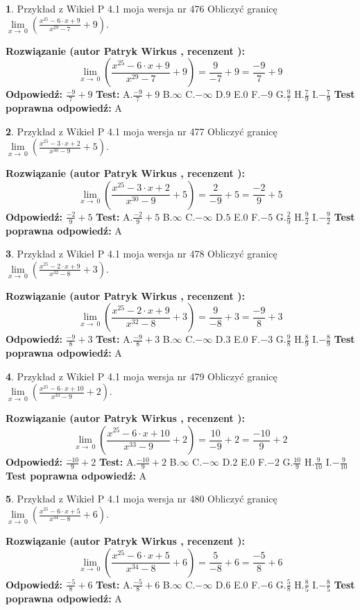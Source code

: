 \documentclass[12pt, a4paper]{article}
\theoremstyle{definition} %
\newtheorem{zad}{}
\newcommand{\zadStart}[1]{\begin{zad}#1\newline}
\newcommand{\zadStop}{\end{zad}}
\newcommand{\rozwStart}[2]{\noindent \textbf{Rozwiązanie (autor #1 , recenzent #2): }\newline}
\newcommand{\rozwStop}{\newline}
\newcommand{\odpStart}{\noindent \textbf{Odpowiedź:}\newline}
\newcommand{\odpStop}{\newline}
\newcommand{\testStart}{\noindent \textbf{Test:}\newline}
\newcommand{\testStop}{\newline}
\newcommand{\kluczStart}{\noindent \textbf{Test poprawna odpowiedź:}\newline}
\newcommand{\kluczStop}{\newline}
\begin{document}
\zadStart{Przykład z Wikieł P 4.1 moja wersja nr 476}
Obliczyć granicę $\lim\limits_{x\to\ 0}(\frac{x^{25}-6 \cdot x +9}{x^{29}-7}+9)$.
\zadStop
\rozwStart{Patryk Wirkus}{}
$$\lim\limits_{x\to\ 0}(\frac{x^{25}-6 \cdot x +9}{x^{29}-7}+9)=\frac{9}{-7}+9=\frac{-9}{7}+9$$
\rozwStop
\odpStart
$\frac{-9}{7}+9$
\odpStop
\testStart
A.$\frac{-9}{7}+9$
B.$\infty$
C.$-\infty$
D.$9$
E.$0$
F.$-9$
G.$\frac{9}{7}$
H.$\frac{7}{9}$
I.$-\frac{7}{9}$
\testStop
\kluczStart
A
\kluczStop



\zadStart{Przykład z Wikieł P 4.1 moja wersja nr 477}
Obliczyć granicę $\lim\limits_{x\to\ 0}(\frac{x^{25}-3 \cdot x +2}{x^{30}-9}+5)$.
\zadStop
\rozwStart{Patryk Wirkus}{}
$$\lim\limits_{x\to\ 0}(\frac{x^{25}-3 \cdot x +2}{x^{30}-9}+5)=\frac{2}{-9}+5=\frac{-2}{9}+5$$
\rozwStop
\odpStart
$\frac{-2}{9}+5$
\odpStop
\testStart
A.$\frac{-2}{9}+5$
B.$\infty$
C.$-\infty$
D.$5$
E.$0$
F.$-5$
G.$\frac{2}{9}$
H.$\frac{9}{2}$
I.$-\frac{9}{2}$
\testStop
\kluczStart
A
\kluczStop



\zadStart{Przykład z Wikieł P 4.1 moja wersja nr 478}
Obliczyć granicę $\lim\limits_{x\to\ 0}(\frac{x^{25}-2 \cdot x +9}{x^{32}-8}+3)$.
\zadStop
\rozwStart{Patryk Wirkus}{}
$$\lim\limits_{x\to\ 0}(\frac{x^{25}-2 \cdot x +9}{x^{32}-8}+3)=\frac{9}{-8}+3=\frac{-9}{8}+3$$
\rozwStop
\odpStart
$\frac{-9}{8}+3$
\odpStop
\testStart
A.$\frac{-9}{8}+3$
B.$\infty$
C.$-\infty$
D.$3$
E.$0$
F.$-3$
G.$\frac{9}{8}$
H.$\frac{8}{9}$
I.$-\frac{8}{9}$
\testStop
\kluczStart
A
\kluczStop



\zadStart{Przykład z Wikieł P 4.1 moja wersja nr 479}
Obliczyć granicę $\lim\limits_{x\to\ 0}(\frac{x^{25}-6 \cdot x +10}{x^{33}-9}+2)$.
\zadStop
\rozwStart{Patryk Wirkus}{}
$$\lim\limits_{x\to\ 0}(\frac{x^{25}-6 \cdot x +10}{x^{33}-9}+2)=\frac{10}{-9}+2=\frac{-10}{9}+2$$
\rozwStop
\odpStart
$\frac{-10}{9}+2$
\odpStop
\testStart
A.$\frac{-10}{9}+2$
B.$\infty$
C.$-\infty$
D.$2$
E.$0$
F.$-2$
G.$\frac{10}{9}$
H.$\frac{9}{10}$
I.$-\frac{9}{10}$
\testStop
\kluczStart
A
\kluczStop



\zadStart{Przykład z Wikieł P 4.1 moja wersja nr 480}
Obliczyć granicę $\lim\limits_{x\to\ 0}(\frac{x^{25}-6 \cdot x +5}{x^{34}-8}+6)$.
\zadStop
\rozwStart{Patryk Wirkus}{}
$$\lim\limits_{x\to\ 0}(\frac{x^{25}-6 \cdot x +5}{x^{34}-8}+6)=\frac{5}{-8}+6=\frac{-5}{8}+6$$
\rozwStop
\odpStart
$\frac{-5}{8}+6$
\odpStop
\testStart
A.$\frac{-5}{8}+6$
B.$\infty$
C.$-\infty$
D.$6$
E.$0$
F.$-6$
G.$\frac{5}{8}$
H.$\frac{8}{5}$
I.$-\frac{8}{5}$
\testStop
\kluczStart
A
\kluczStop
\end{document}
